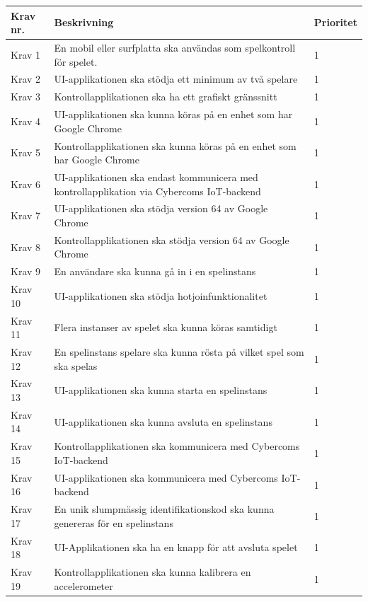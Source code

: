\documentclass[10pt]{article}
\begin{document}
	\begin{tabular}{| p{2cm} | p{8cm} | p{2cm}|}
		\hline
		
		\textbf{Krav nr.} & \textbf{Beskrivning} &\textbf{Prioritet} \\ \hline
		Krav 1 & En mobil eller surfplatta ska användas som spelkontroll för spelet. & 1 \\ \hline
		Krav 2 & UI-applikationen ska stödja ett minimum av två spelare & 1 \\ \hline
		Krav 3 & Kontrollapplikationen ska ha ett grafiskt gränssnitt & 1 \\ \hline
		Krav 4 & UI-applikationen ska kunna köras på en enhet som har Google Chrome & 1 \\ \hline
		Krav 5 & Kontrollapplikationen ska kunna köras på en enhet som har Google Chrome & 1 \\ \hline
		Krav 6 & UI-applikationen ska endast kommunicera med \newline kontrollapplikation via  Cybercoms IoT-backend & 1 \\ \hline
		Krav 7 & UI-applikationen ska stödja version 64 av Google Chrome & 1 \\ \hline
		Krav 8 & Kontrollapplikationen ska stödja version 64 av Google Chrome & 1 \\ \hline
		Krav 9 & En användare ska kunna gå in i en spelinstans & 1 \\ \hline
		Krav 10 & UI-applikationen ska stödja hotjoinfunktionalitet & 1 \\ \hline
		Krav 11 & Flera instanser av spelet ska kunna köras samtidigt & 1 \\ \hline
		Krav 12 & En spelinstans spelare ska kunna rösta på vilket spel som ska spelas & 1 \\ \hline
		Krav 13 & UI-applikationen ska kunna starta en spelinstans & 1 \\ \hline
		Krav 14 & UI-applikationen ska kunna avsluta en spelinstans & 1 \\ \hline
		Krav 15 & Kontrollapplikationen ska kommunicera med Cybercoms IoT-backend & 1 \\ \hline
		Krav 16 & UI-applikationen ska kommunicera med Cybercoms IoT-backend & 1\\ \hline
		Krav 17 & En unik slumpmässig identifikationskod ska kunna genereras för en spelinstans & 1 \\ \hline
		Krav 18 & UI-Applikationen ska ha en knapp för att avsluta spelet & 1 \\ \hline
		Krav 19 & Kontrollapplikationen ska kunna kalibrera en accelerometer & 1 \\ \hline

\end{tabular}
\end{document}
